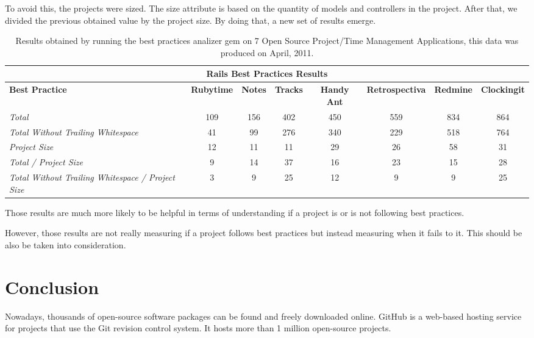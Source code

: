 \documentclass[sle]{llncs}
\begin{document}
To avoid this, the projects were sized.
The size attribute is based on the quantity of models and controllers in the project. 
After that, we divided the previous obtained value by the project size.
By doing that, a new set of results emerge.

\begin{table}[H]
\begin{center}
{\scriptsize
\begin{threeparttable}
\begin{tabular}{|l||c|c|c|c|c|c|c|} \hline 
\multicolumn{8}{|c|}{Rails Best Practices Results} \\ \hline 
\textbf{Best Practice}& \textbf{Rubytime}& \textbf{Notes}& \textbf{Tracks}&  \textbf{Handy Ant}& \textbf{Retrospectiva}& \textbf{Redmine}& \textbf{Clockingit} \\\hline\hline
\emph{Total                                           }              & 109  & 156  & 402  & 450 & 559 & 834 & 864  \\ \hline 
\emph{Total Without Trailing Whitespace               }              &  41  &  99  & 276  & 340 & 229 & 518 & 764  \\ \hline 
\emph{Project Size                                    }              &  12  &  11  &  11  &  29 &  26 &  58 &  31  \\ \hline 
\emph{Total / Project Size                            }              &   9  &  14  &  37  &  16 &  23 &  15 &  28  \\ \hline 
\emph{Total Without Trailing Whitespace / Project Size}              &   3  &   9  &  25  &  12 &   9 &   9 &  25  \\ \hline 
\end{tabular}
\end{threeparttable}
}
\end{center}
\caption{Results obtained by running the best practices analizer gem on 7 Open Source Project/Time Management Applications, this data was produced on April, 2011.}
\label{table:OSPHWebSites}
\end{table}

Those results are much more likely to be helpful in terms of understanding if a project is or is not following best practices.

However, those results are not really measuring if a project follows best practices but instead measuring when it fails to it.
This should be also be taken into consideration. 




\section{Conclusion}
Nowadays, thousands of open-source software packages can be found and freely downloaded online.
GitHub is a web-based hosting service for projects that use the Git revision control system.
It hosts more than 1 million open-source projects.
\end{document}
